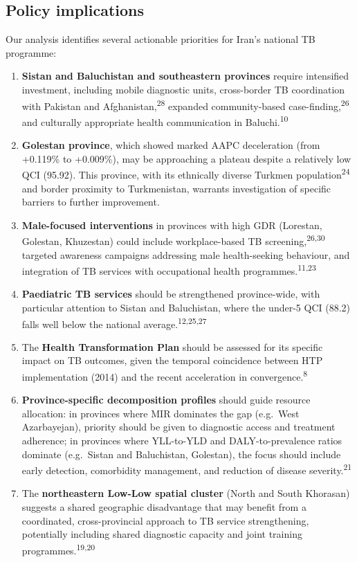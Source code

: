 \documentclass[12pt]{article}
\begin{document}
\subsection{Policy implications}

Our analysis identifies several actionable priorities for Iran's national TB programme:

\begin{enumerate}
\item \textbf{Sistan and Baluchistan and southeastern provinces} require intensified investment, including mobile diagnostic units, cross-border TB coordination with Pakistan and Afghanistan,\textsuperscript{28} expanded community-based case-finding,\textsuperscript{26} and culturally appropriate health communication in Baluchi.\textsuperscript{10}

\item \textbf{Golestan province}, which showed marked AAPC deceleration (from +0.119\% to +0.009\%), may be approaching a plateau despite a relatively low QCI (95.92). This province, with its ethnically diverse Turkmen population\textsuperscript{24} and border proximity to Turkmenistan, warrants investigation of specific barriers to further improvement.

\item \textbf{Male-focused interventions} in provinces with high GDR (Lorestan, Golestan, Khuzestan) could include workplace-based TB screening,\textsuperscript{26,30} targeted awareness campaigns addressing male health-seeking behaviour, and integration of TB services with occupational health programmes.\textsuperscript{11,23}

\item \textbf{Paediatric TB services} should be strengthened province-wide, with particular attention to Sistan and Baluchistan, where the under-5 QCI (88.2) falls well below the national average.\textsuperscript{12,25,27}

\item The \textbf{Health Transformation Plan} should be assessed for its specific impact on TB outcomes, given the temporal coincidence between HTP implementation (2014) and the recent acceleration in convergence.\textsuperscript{8}

\item \textbf{Province-specific decomposition profiles} should guide resource allocation: in provinces where MIR dominates the gap (e.g.\ West Azarbayejan), priority should be given to diagnostic access and treatment adherence; in provinces where YLL-to-YLD and DALY-to-prevalence ratios dominate (e.g.\ Sistan and Baluchistan, Golestan), the focus should include early detection, comorbidity management, and reduction of disease severity.\textsuperscript{21}

\item The \textbf{northeastern Low-Low spatial cluster} (North and South Khorasan) suggests a shared geographic disadvantage that may benefit from a coordinated, cross-provincial approach to TB service strengthening, potentially including shared diagnostic capacity and joint training programmes.\textsuperscript{19,20}
\end{enumerate}
\end{document}
